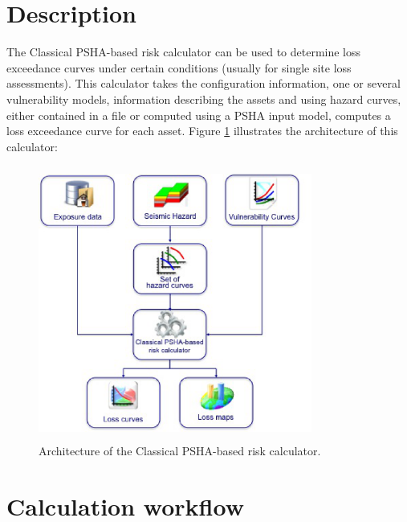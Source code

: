 \section{Description}
The Classical PSHA-based risk calculator can be used to determine loss exceedance curves under certain conditions (usually for single site loss assessments). This calculator takes the configuration information, one or several vulnerability models, information describing the assets and using hazard curves, either contained in a file or computed using a PSHA input model, computes a loss exceedance curve for each asset. Figure \ref{fig:Scheme_PSHA_calc} illustrates the architecture of this calculator:

\begin{figure}[ht]
\centering
\includegraphics[width=9cm,height=9cm]{./Figures/Part_Risk/Scheme_PSHA_calc.eps}
\caption{Architecture of the Classical PSHA-based risk calculator.}
\label{fig:Scheme_PSHA_calc}
\end{figure}

\section{Calculation workflow}

